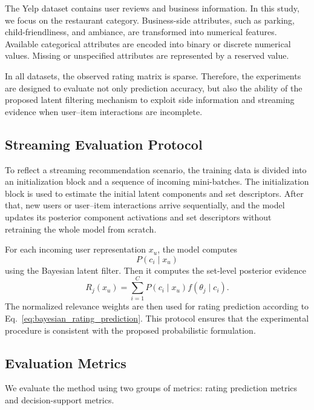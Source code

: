 \documentclass{article}
\theoremstyle{plain}
\theoremstyle{definition}
\theoremstyle{remark}
\begin{document}
The Yelp dataset contains user reviews and business information. In this study, we focus on the restaurant category. Business-side attributes, such as parking, child-friendliness, and ambiance, are transformed into numerical features. Available categorical attributes are encoded into binary or discrete numerical values. Missing or unspecified attributes are represented by a reserved value.

In all datasets, the observed rating matrix is sparse. Therefore, the experiments are designed to evaluate not only prediction accuracy, but also the ability of the proposed latent filtering mechanism to exploit side information and streaming evidence when user--item interactions are incomplete.

\subsection{Streaming Evaluation Protocol}
\label{subsec:streaming_protocol}

To reflect a streaming recommendation scenario, the training data is divided into an initialization block and a sequence of incoming mini-batches. The initialization block is used to estimate the initial latent components and set descriptors. After that, new users or user--item interactions arrive sequentially, and the model updates its posterior component activations and set descriptors without retraining the whole model from scratch.

For each incoming user representation \(x_u\), the model computes
\[
P(c_i\mid x_u)
\]
using the Bayesian latent filter. Then it computes the set-level posterior evidence
\[
R_j(x_u)
=
\sum_{i=1}^{C}
P(c_i\mid x_u)f(\theta_j\mid c_i).
\]
The normalized relevance weights are then used for rating prediction according to Eq.~\eqref{eq:bayesian_rating_prediction}. This protocol ensures that the experimental procedure is consistent with the proposed probabilistic formulation.

\subsection{Evaluation Metrics}
\label{subsec:evaluation_metrics}

We evaluate the method using two groups of metrics: rating prediction metrics and decision-support metrics.
\end{document}
